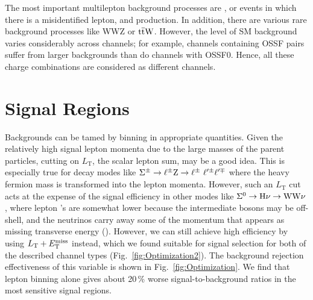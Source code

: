 The most important multilepton background processes are \WZ, \Z or \ttbar events in which there is a misidentified lepton, and \ZZ production. In addition, there are various rare background processes like WWZ or $\mathrm{t}\overline{\mathrm{t}}\mathrm{W}$. However, the level of SM background varies considerably across channels; for example, channels containing OSSF pairs suffer from larger backgrounds than do channels with OSSF0. Hence, all these charge combinations are considered as different channels.


\section{Signal Regions}
\label{sec:Optimization}


Backgrounds can be tamed by binning in appropriate quantities. Given the relatively high signal lepton momenta due to the large masses of the parent particles, cutting on $L_\textrm{T}$, the scalar lepton \pt sum, may be a good idea. This is especially true for decay modes like $\Sigma^\pm \to \ell^\pm \mathrm{Z} \to \ell^\pm ~ \ell^{\prime \pm} \ell^{\prime \mp}$ where the heavy fermion mass is transformed into the lepton momenta. However, such an $L_\textrm{T}$ cut acts at the expense of the signal efficiency in other modes like $\Sigma^0 \to \mathrm{H} \nu \to \mathrm{W}\mathrm{W}\nu$, where lepton \pt's are somewhat lower because the intermediate bosons may be off-shell, and the neutrinos carry away some of the momentum that appears as missing transverse energy (\MET). However, we can still achieve high efficiency by using $L_\textrm{T} + E_{\mathrm{T}}^{\text{miss}}$ instead, which we found suitable for signal selection for both of the described channel types (Fig.~\ref{fig:Optimization2}). The background rejection effectiveness of this variable is shown in Fig.~\ref{fig:Optimization}. We find that lepton \pt binning alone gives about 20\,\% worse signal-to-background ratios in the most sensitive signal regions.

